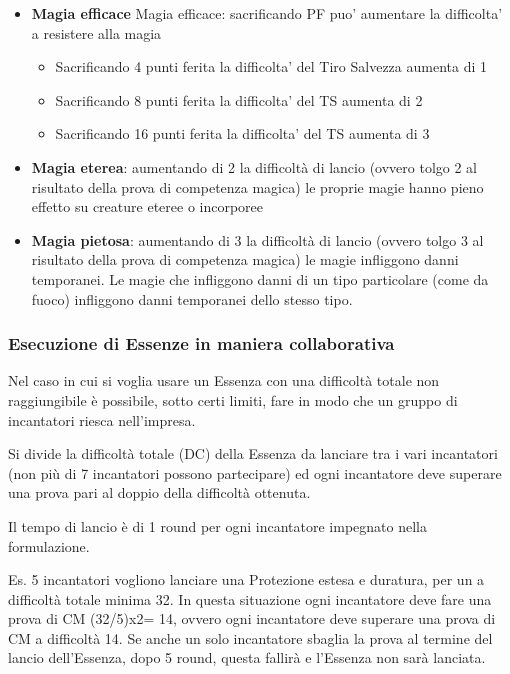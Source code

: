 \documentclass[a4paper,11pt,twoside,openany]{book}
\begin{document}
\begin{itemize}
	\item
	      \textbf{Magia efficace}
	      Magia efficace: sacrificando PF puo’ aumentare la difficolta’ a resistere alla magia
	      \begin{itemize}
      \item Sacrificando 4 punti ferita la difficolta’ del Tiro Salvezza aumenta di 1
      \item Sacrificando 8 punti ferita la difficolta’ del TS aumenta di 2

      \item Sacrificando 16 punti ferita la difficolta’ del TS aumenta di 3
	      \end{itemize}
\end{itemize}
%
\begin{itemize}
	\item
	      \textbf{Magia eterea}: aumentando di 2 la difficoltà di lancio (ovvero tolgo 2 al risultato della prova di competenza magica) le proprie magie hanno pieno effetto su creature eteree o incorporee
\end{itemize}
%
\begin{itemize}
	\item
	      \textbf{Magia pietosa}: aumentando di 3 la difficoltà di lancio (ovvero tolgo 3 al risultato della prova di competenza magica) le magie infliggono danni temporanei. Le magie che infliggono danni di un tipo particolare (come da fuoco) infliggono danni temporanei dello stesso tipo.
\end{itemize}

\subsubsection{Esecuzione di Essenze in maniera collaborativa}

Nel caso in cui si voglia usare un Essenza con una difficoltà totale non raggiungibile è possibile, sotto certi limiti, fare in modo che un gruppo di incantatori riesca nell'impresa.

Si divide la difficoltà totale (DC) della Essenza da lanciare tra i vari incantatori (non più di 7 incantatori possono partecipare) ed ogni incantatore deve superare una prova pari al doppio della difficoltà ottenuta.

Il tempo di lancio è di 1 round per ogni incantatore impegnato nella formulazione.

Es. 5 incantatori vogliono lanciare una Protezione estesa e duratura, per un a difficoltà totale minima 32. In questa situazione ogni incantatore deve fare una prova di CM (32/5)x2= 14, ovvero ogni incantatore deve superare una prova di CM a difficoltà 14. Se anche un solo incantatore sbaglia la prova al termine del lancio dell'Essenza, dopo 5 round, questa fallirà e l'Essenza non sarà lanciata.
\end{document}

